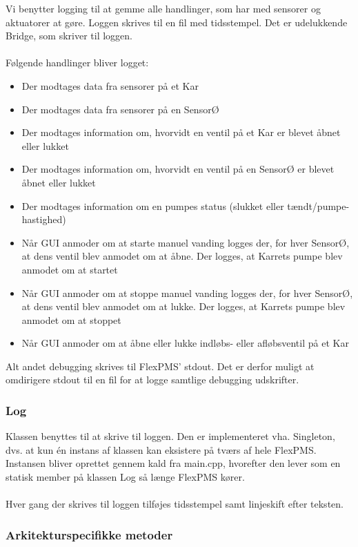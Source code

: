 Vi benytter logging til at gemme alle handlinger, som har med sensorer og aktuatorer at gøre. Loggen skrives til en fil med tidsstempel. Det er udelukkende Bridge, som skriver til loggen.\\\\

Følgende handlinger bliver logget:

\begin{itemize}
\item Der modtages data fra sensorer på et Kar
\item Der modtages data fra sensorer på en SensorØ
\item Der modtages information om, hvorvidt en ventil på et Kar er blevet åbnet eller lukket
\item Der modtages information om, hvorvidt en ventil på en SensorØ er blevet åbnet eller lukket
\item Der modtages information om en pumpes status (slukket eller tændt/pumpe-hastighed)
\item Når GUI anmoder om at starte manuel vanding logges der, for hver SensorØ, at dens ventil blev anmodet om at åbne. Der logges, at Karrets pumpe blev anmodet om at startet
\item Når GUI anmoder om at stoppe manuel vanding logges der, for hver SensorØ, at dens ventil blev anmodet om at lukke. Der logges, at Karrets pumpe blev anmodet om at stoppet
\item Når GUI anmoder om at åbne eller lukke indløbs- eller afløbsventil på et Kar
\end{itemize}

Alt andet debugging skrives til FlexPMS' stdout. Det er derfor muligt at omdirigere stdout til en fil for at logge samtlige debugging udskrifter.



\subsubsection{Log}
Klassen benyttes til at skrive til loggen. Den er implementeret vha. Singleton, dvs. at kun én instans af klassen kan eksistere på tværs af hele FlexPMS. Instansen bliver oprettet gennem kald fra main.cpp, hvorefter den lever som en statisk member på klassen Log så længe FlexPMS kører.\\\\

Hver gang der skrives til loggen tilføjes tidsstempel samt linjeskift efter teksten.

\subsubsection{Arkitekturspecifikke metoder}

{}

{
}

